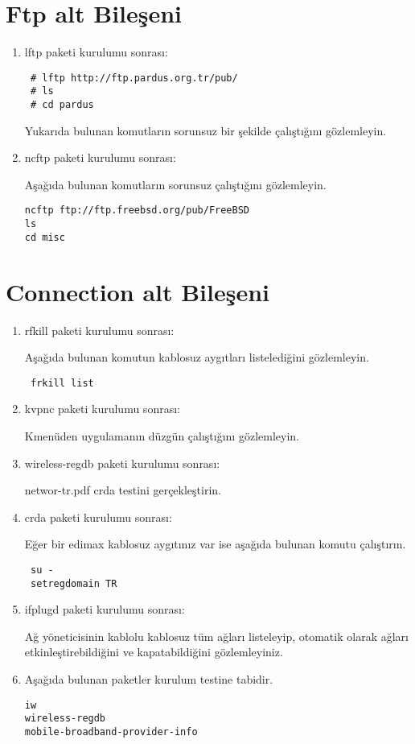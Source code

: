 \documentclass[a4paper,10pt]{article}
\begin{document}
\section{Ftp alt Bileşeni}
\begin{enumerate}
 \item lftp paketi kurulumu sonrası:
\begin{verbatim}
 # lftp http://ftp.pardus.org.tr/pub/
 # ls 
 # cd pardus
\end{verbatim}
Yukarıda bulunan komutların sorunsuz bir şekilde çalıştığını gözlemleyin.
 \item ncftp paketi kurulumu sonrası:

Aşağıda bulunan komutların sorunsuz çalıştığını gözlemleyin.
\begin{verbatim}
ncftp ftp://ftp.freebsd.org/pub/FreeBSD 
ls
cd misc
\end{verbatim}



\end{enumerate}

\section{Connection alt Bileşeni}
\begin{enumerate}
\item rfkill paketi kurulumu sonrası:

Aşağıda bulunan komutun kablosuz aygıtları listelediğini gözlemleyin.
\begin{verbatim}
 frkill list
\end{verbatim}


\item kvpnc paketi kurulumu sonrası:

Kmenüden uygulamanın düzgün çalıştığını gözlemleyin.
\item wireless-regdb paketi kurulumu sonrası:

networ-tr.pdf crda testini gerçekleştirin.
\item crda paketi kurulumu sonrası:

Eğer bir edimax kablosuz aygıtınız var ise aşağıda bulunan komutu çalıştırın.
\begin{verbatim}
 su -
 setregdomain TR
\end{verbatim}

\item ifplugd paketi kurulumu sonrası:

Ağ yöneticisinin kablolu kablosuz tüm ağları listeleyip, otomatik olarak ağları etkinleştirebildiğini ve kapatabildiğini gözlemleyiniz.

 \item Aşağıda bulunan paketler kurulum testine tabidir.
\begin{verbatim}
iw
wireless-regdb
mobile-broadband-provider-info
\end{verbatim}

\end{enumerate}
\end{document}
